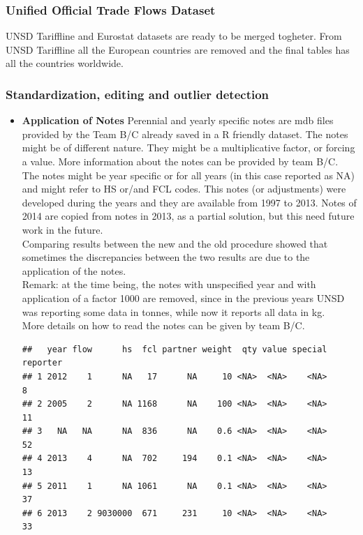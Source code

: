 \documentclass[nojss]{jss}\usepackage[]{graphicx}\usepackage[]{color}
\makeatletter
\newenvironment{kframe}{%
 \def\at@end@of@kframe{}%
 \ifinner\ifhmode%
  \def\at@end@of@kframe{\end{minipage}}%
  \begin{minipage}{\columnwidth}%
 \fi\fi%
 \def\FrameCommand##1{\hskip\@totalleftmargin \hskip-\fboxsep
 \colorbox{shadecolor}{##1}\hskip-\fboxsep
     \hskip-\linewidth \hskip-\@totalleftmargin \hskip\columnwidth}%
 \MakeFramed {\advance\hsize-\width
   \@totalleftmargin\z@ \linewidth\hsize
   \@setminipage}}%
 {\par\unskip\endMakeFramed%
 \at@end@of@kframe}
\newenvironment{knitrout}{}{} %
\makeatother
\begin{document}
\subsubsection{Unified Official Trade Flows Dataset}
UNSD Tariffline and Eurostat datasets are ready to be merged togheter. From UNSD Tariffline all the European countries are removed and the final tables has all the countries worldwide.

\subsubsection{Standardization, editing and outlier detection}
\begin{itemize}
\item {\bf Application of Notes} Perennial and yearly specific notes are mdb files provided by the Team B/C already saved in a R friendly dataset. The notes might be of different nature. They might be a multiplicative factor, or forcing a value. More information  about the notes can be provided by team B/C. The notes might be year specific or for all years (in this case reported as NA) and might refer to HS or/and FCL codes. This notes (or adjustments) were developed during the years and they are available from 1997 to 2013. Notes of 2014 are copied from notes in 2013, as a partial solution, but this need future work in the future.\\
Comparing results between the new and the old procedure showed that sometimes the discrepancies between the two results are due to the application of the notes.\\
Remark: at the time being, the notes with unspecified year and with application of a factor 1000 are removed, since in the previous years UNSD was reporting some data in tonnes, while now it reports all data in kg.\\
More details on how to read the notes can be given by team B/C.
\begin{knitrout}
\color{fgcolor}\begin{kframe}
\begin{verbatim}
##   year flow      hs  fcl partner weight  qty value special reporter
## 1 2012    1      NA   17      NA     10 <NA>  <NA>    <NA>        8
## 2 2005    2      NA 1168      NA    100 <NA>  <NA>    <NA>       11
## 3   NA   NA      NA  836      NA    0.6 <NA>  <NA>    <NA>       52
## 4 2013    4      NA  702     194    0.1 <NA>  <NA>    <NA>       13
## 5 2011    1      NA 1061      NA    0.1 <NA>  <NA>    <NA>       37
## 6 2013    2 9030000  671     231     10 <NA>  <NA>    <NA>       33
\end{verbatim}
\end{kframe}
\end{knitrout}



\end{itemize}
\end{document}
